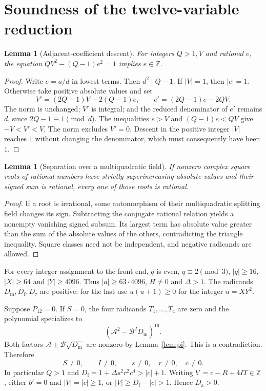 \documentclass[11pt,a4paper]{article}
\newtheorem{lemma}[theorem]{Lemma}
\theoremstyle{definition}\newtheorem{definition}[theorem]{Definition}
\theoremstyle{remark}\newtheorem{remark}[theorem]{Remark}
\newcommand{\Z}{\mathbb Z}\newcommand{\Q}{\mathbb Q}\newcommand{\N}{\mathbb N}\newcommand{\R}{\mathbb R}
\newcommand{\Dm}{D_{\mathrm m}}\newcommand{\Df}{D_{\mathrm f}}
\newcommand{\Dt}{D_{\tau}}\newcommand{\Da}{D_{\mathrm a}}
\numberwithin{equation}{section}
\begin{document}
\section{Soundness of the twelve-variable reduction}
\label{sec:soundness12}

\begin{lemma}[Adjacent-coefficient descent]\label{lem:descent}
For integers $Q>1,V$ and rational $e$, the equation
$QV^2-(Q-1)e^2=1$ implies $e\in\Z$.
\end{lemma}
\begin{proof}
Write $e=a/d$ in lowest terms. Then $d^2\mid Q-1$. If $|V|=1$,
then $|e|=1$. Otherwise take positive absolute values and set
\[
 V'=(2Q-1)V-2(Q-1)e,\qquad e'=(2Q-1)e-2QV.
\]
The norm is unchanged; $V'$ is integral; and the reduced denominator of
$e'$ remains $d$, since $2Q-1\equiv1\pmod d$. The inequalities
$e>V$ and $(Q-1)e<QV$ give $-V<V'<V$. The norm excludes $V'=0$.
Descent in the positive integer $|V|$ reaches $1$ without changing the
denominator, which must consequently have been $1$.
\end{proof}

\begin{lemma}[Separation over a multiquadratic field]\label{lem:separation}
If nonzero complex square roots of rational numbers have strictly
superincreasing absolute values and their signed sum is rational, every
one of those roots is rational.
\end{lemma}
\begin{proof}
If a root is irrational, some automorphism of their multiquadratic
splitting field changes its sign. Subtracting the conjugate rational
relation yields a nonempty vanishing signed subsum. Its largest term
has absolute value greater than the sum of the absolute values of the
others, contradicting the triangle inequality. Square classes need not
be independent, and negative radicands are allowed.
\end{proof}

For every integer assignment to the front end, $q$ is even,
$q\equiv2\pmod3$, $|q|\ge16$, $|X|\ge64$ and $|Y|\ge4096$.
Thus $|a|\ge63\cdot4096$, $H\ne0$ and $\Delta>1$.
The radicands $\Dm,\Df,\Dt$ are positive: for the last use
$u(u+1)\ge0$ for the integer $u=XY^2$.

Suppose $P_{12}=0$. If $S=0$, the four radicands $T_1,\ldots,T_4$
are zero and the polynomial specializes to
\[
 (\mathcal A^2-\mathcal B^2\Dm)^{16}.
\]
Both factors $\mathcal A\pm\mathcal B\sqrt{\Dm}$ are nonzero by
Lemma~\ref{lem:pi}. This is a contradiction. Therefore
\begin{equation}
 S\ne0,\qquad I\ne0,\qquad s\ne0,\quad r\ne0,\quad c\ne0.
 \label{eq:nonzero12}
\end{equation}
In particular $Q>1$ and $\Df=1+\Delta s^2r^2c^4>|c|+1$.
Writing $b'=c-R+4IT\in\Z$, either $b'=0$ and $|V|=|c|\ge1$,
or $|V|\ge\Df-|c|>1$. Hence $\Da>0$.
\end{document}
